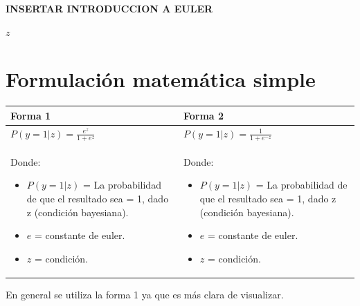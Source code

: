\documentclass[
  letterpaper,
  DIV=11,
  numbers=noendperiod]{scrreprt}
\begin{document}
\textbf{INSERTAR INTRODUCCION A EULER}

\(z\)

\section{\texorpdfstring{\textbf{Formulación matemática
simple}}{Formulación matemática simple}}\label{formulaciuxf3n-matemuxe1tica-simple}

\begin{longtable}[]{@{}
  >{\raggedright\arraybackslash}p{}
  >{\raggedright\arraybackslash}p{}@{}}
\toprule\noalign{}
\begin{minipage}[b]{\linewidth}\raggedright
Forma 1
\end{minipage} & \begin{minipage}[b]{\linewidth}\raggedright
Forma 2
\end{minipage} \\
\midrule\noalign{}
\endhead
\bottomrule\noalign{}
\endlastfoot
\(
P(y = 1|z) = \frac{e^z}{1+e^z}
\) & \(
P(y = 1|z) = \frac{1}{1+e^{-z}}
\) \\
\begin{minipage}[t]{\linewidth}\raggedright
Donde:

\begin{itemize}
\item
  \(P(y=1|z)\) = La probabilidad de que el resultado sea = 1, dado z
  (condición bayesiana).
\item
  \(e\) = constante de euler.
\item
  \(z\) = condición.
\end{itemize}
\end{minipage} & \begin{minipage}[t]{\linewidth}\raggedright
Donde:

\begin{itemize}
\item
  \(P(y=1|z)\) = La probabilidad de que el resultado sea = 1, dado z
  (condición bayesiana).
\item
  \(e\) = constante de euler.
\item
  \(z\) = condición.
\end{itemize}
\end{minipage} \\
\end{longtable}

En general se utiliza la forma 1 ya que es más clara de visualizar.
\end{document}
